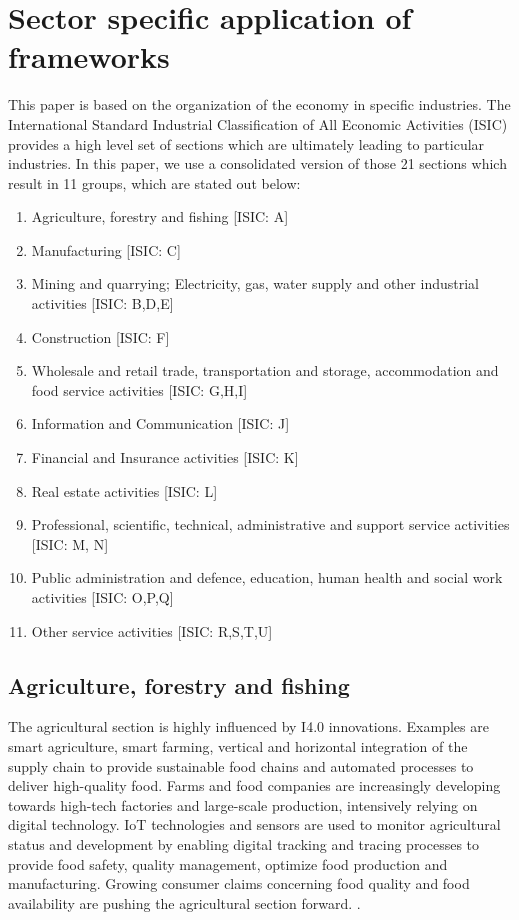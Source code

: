 \section{Sector specific application of frameworks}

This paper is based on the organization of the economy in specific industries. The International Standard Industrial Classification of All Economic Activities (\ac{ISIC}) provides a high level set of sections which are ultimately leading to particular industries. In this paper, we use a consolidated version of those 21 sections which result in 11 groups, which are stated out below: \cite[p.271, table 4]{ISIC:2008}

\begin{enumerate}
\item Agriculture, forestry and fishing [ISIC: A]
\item Manufacturing [ISIC: C]
\item Mining and quarrying; Electricity, gas, water supply and other industrial activities [ISIC: B,D,E]
\item Construction [ISIC: F]
\item Wholesale and retail trade, transportation and storage, accommodation and food service activities [ISIC: G,H,I]
\item Information and Communication [ISIC: J]
\item Financial and Insurance activities [ISIC: K]
\item Real estate activities [ISIC: L]
\item Professional, scientific, technical, administrative and support service activities [ISIC: M, N]
\item Public administration and defence, education, human health and social work activities [ISIC: O,P,Q]
\item Other service activities [ISIC: R,S,T,U]
\end{enumerate}

\subsection{Agriculture, forestry and fishing}

The agricultural section is highly influenced by \ac{I4.0} innovations. Examples are smart agriculture, smart farming, vertical and horizontal integration of the supply chain to provide sustainable food chains and automated processes to deliver high-quality food. Farms and food companies are increasingly developing towards high-tech factories and large-scale production, intensively relying on digital technology. \cite[p.129-151]{FoodAndFarm2020} \ac{IoT} technologies and sensors are used to monitor agricultural status and development by enabling digital tracking and tracing processes to provide food safety, quality management, optimize food production and manufacturing. Growing consumer claims concerning food quality and food availability are pushing the agricultural section forward. \cite[p.131]{FoodAndFarm2020}.



